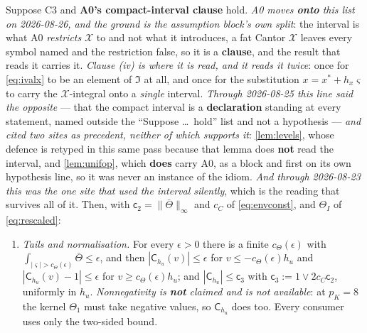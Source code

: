 \begin{lemma}\label{lem:intker}
Suppose C3 and \textbf{A0's compact-interval clause} hold. \emph{A0 moves \textbf{onto} this list on
2026-08-26, and the ground is the assumption block's own split}: the interval is what A0 \emph{restricts}
$\mathcal X$ to and not what it introduces, a fat Cantor $\mathcal X$ leaves every symbol named and the
restriction false, so it is a \textbf{clause}, and the result that reads it carries it.
\emph{Clause \textup{(iv)} is where it is read, and it reads it twice}: once for
\eqref{eq:ivalx} to be an element of $\mathfrak I$ at all, and once for the substitution
$x=x^\ast+h_x\varsigma$ to carry the $\mathcal X$-integral onto a \emph{single} interval.
\emph{Through 2026-08-25 this line said the opposite} --- that the compact interval is a
\textbf{declaration} standing at every statement, named outside the ``Suppose \dots\ hold'' list and not
a hypothesis --- \emph{and cited two sites as precedent, neither of which supports it}:
\cref{lem:levels}, whose defence is retyped in this same pass because that lemma does \textbf{not} read
the interval, and \cref{lem:unifop}, which \textbf{does} carry A0, as a block and first on its own
hypothesis line, so it was never an instance of the idiom. \emph{And through 2026-08-23
this was the one site that used the interval silently}, which is the reading that survives all of it. Then, with $\mathsf c_2=\|\bar\Theta\|_\infty$ and $c_C$ of \eqref{eq:envconst},
and $\Theta_{I}$ of \eqref{eq:rescaled}:
\begin{enumerate}
\item[(i)] \emph{Tails and normalisation.} For every $\epsilon>0$ there is a finite
$c_\Theta(\epsilon)$ with $\int_{|\varsigma|>c_\Theta(\epsilon)}\bar\Theta\le\epsilon$, and then
$|\mathsf C_{h_u}(v)|\le\epsilon$ for $v\le-c_\Theta(\epsilon)h_u$ and
$|\mathsf C_{h_u}(v)-1|\le\epsilon$ for $v\ge c_\Theta(\epsilon)h_u$; and
$|\mathsf C_{h_u}|\le\mathsf c_3$ with
$\mathsf c_3:=1\vee 2c_C\mathsf c_2$, uniformly in $h_u$. \emph{Nonnegativity is \textbf{not} claimed
and is not available}: at $p_K=8$ the kernel $\Theta_1$ must take negative values, so
$\mathsf C_{h_u}$ does too. Every consumer uses only the two-sided bound.

\end{enumerate}
\end{lemma}
